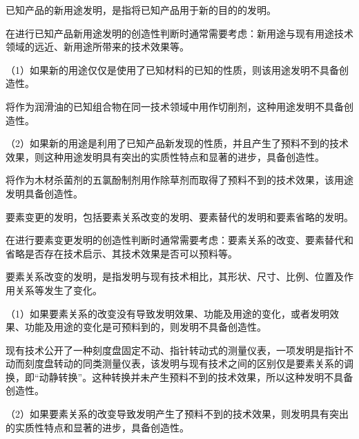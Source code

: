已知产品的新用途发明，是指将已知产品用于新的目的的发明。

在进行已知产品新用途发明的创造性判断时通常需要考虑：新用途与现有用途技术领域的远近、新用途所带来的技术效果等。

{\setlength{\parindent}{17.1bp}（1）如果新的用途仅仅是使用了已知材料的已知的性质，则该用途发明不具备创造性。\par}

{\par}

将作为润滑油的已知组合物在同一技术领域中用作切削剂，这种用途发明不具备创造性。

{\setlength{\parindent}{17.1bp}（2）如果新的用途是利用了已知产品新发现的性质，并且产生了预料不到的技术效果，则这种用途发明具有突出的实质性特点和显著的进步，具备创造性。\par}

{\par}

将作为木材杀菌剂的五氯酚制剂用作除草剂而取得了预料不到的技术效果，该用途发明具备创造性。

要素变更的发明，包括要素关系改变的发明、要素替代的发明和要素省略的发明。

在进行要素变更发明的创造性判断时通常需要考虑：要素关系的改变、要素替代和省略是否存在技术启示、其技术效果是否可以预料等。

要素关系改变的发明，是指发明与现有技术相比，其形状、尺寸、比例、位置及作用关系等发生了变化。

{\setlength{\parindent}{17.1bp}（1）如果要素关系的改变没有导致发明效果、功能及用途的变化，或者发明效果、功能及用途的变化是可预料到的，则发明不具备创造性。\par}

{\par}

现有技术公开了一种刻度盘固定不动、指针转动式的测量仪表，一项发明是指针不动而刻度盘转动的同类测量仪表，该发明与现有技术之间的区别仅是要素关系的调换，即“动静转换”。这种转换并未产生预料不到的技术效果，所以这种发明不具备创造性。

{\setlength{\parindent}{17.1bp}（2）如果要素关系的改变导致发明产生了预料不到的技术效果，则发明具有突出的实质性特点和显著的进步，具备创造性。\par}

